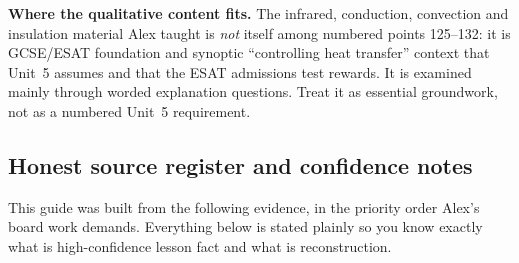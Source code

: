 \documentclass[11pt,a4paper]{article}
\begin{document}
\begin{plainbox}
\textbf{Where the qualitative content fits.} The infrared, conduction, convection and
insulation material Alex taught is \emph{not} itself among numbered points 125--132: it is
GCSE/ESAT foundation and synoptic ``controlling heat transfer'' context that Unit~5 assumes
and that the ESAT admissions test rewards. It is examined mainly through worded explanation
questions. Treat it as essential groundwork, not as a numbered Unit~5 requirement.
\end{plainbox}

\subsection{Honest source register and confidence notes}

This guide was built from the following evidence, in the priority order Alex's board
work demands. Everything below is stated plainly so you know exactly what is
high-confidence lesson fact and what is reconstruction.
\end{document}
